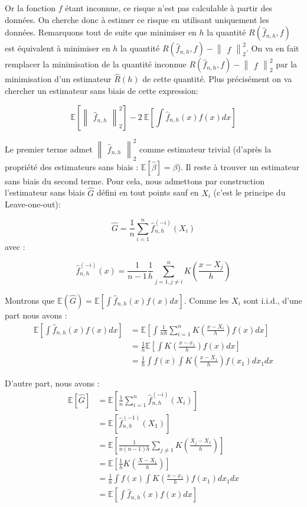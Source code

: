 \documentclass[
]{book}
\theoremstyle{definition}
\theoremstyle{definition}
\theoremstyle{definition}
\theoremstyle{definition}
\theoremstyle{remark}
\begin{document}
Or la fonction \(f\) étant inconnue, ce risque n'est pas calculable à partir des données. On cherche donc à estimer ce risque en utilisant uniquement les données. Remarquons tout de suite que minimiser en \(h\) la quantité \(R(\hat {f}_{n,h}, f)\) est équivalent à minimiser en \(h\) la quantité \(R(\hat {f}_{n,h}, f)-\begin{Vmatrix}f\end{Vmatrix}_2^2\). On va en fait remplacer la minimisation de la quantité inconnue \(R(\hat {f}_{n,h}, f)-\begin{Vmatrix}f\end{Vmatrix}_2^2\) par la minimisation d'un estimateur \(\hat {R}(h)\) de cette quantité. Plus précisément on va chercher un estimateur sans biais de cette expression:

\[
\mathbb{E}[\begin{Vmatrix}\hat {f}_{n,h}\end{Vmatrix}_2^2] -2~\mathbb{E}[\int \hat {f}_{n,h}(x)f(x)dx]
\]

Le premier terme admet \(\begin{Vmatrix}\hat {f}_{n,h}\end{Vmatrix}_2^2\) comme estimateur trivial (d'après la propriété des estimateurs sans biais : \(\mathbb{E}[\hat {\beta}]=\beta\)).\newline
Il reste à trouver un estimateur sans biais du second terme. Pour cela, nous admettons par construction l'estimateur sans biais \(\hat {G}\) défini en tout points sauf en \(X_i\) (c'est le principe du Leave-one-out):

\[
\hat{G} = \frac{1}{n}\sum_{i=1}^n\hat {f}_{n,h}^{(-i)}(X_i)
\]
avec :

\[
  \hat {f}_{n,h}^{(-i)}(x)= \frac{1}{n-1}\frac{1}{h}\sum_{j=1,j\ne i}^nK(\frac{x-X_j}{h})
\]

Montrons que \(\mathbb{E}(\hat{G})=\mathbb{E}[\int \hat{f}_{n,h}(x)f(x)dx]\).\newline
Comme les \(X_i\) sont i.i.d., d'une part nous avons :
\[
\begin{aligned}
\mathbb{E}[\int \hat {f}_{n,h}(x)f(x)dx]&= \mathbb{E}[\int \frac {1}{nh}\sum_{i=1}^nK(\frac {x-X_i}{h})f(x)dx]\\
&=\frac{1}{h}\mathbb{E}[\int K(\frac {x-x_1}{h})f(x)dx] \\
&=\frac{1}{h}\int f(x)\int K(\frac {x-X_1}{h})f(x_1)dx_1dx
\end{aligned}
\]

D'autre part, nous avons :
\[ 
\begin{aligned}
\mathbb{E}[\hat{G}]&=\mathbb{E}[\frac{1}{n}\sum_{i=1}^n\hat{f}_{n,h}^{(-i)}(X_i)]\\
&=\mathbb{E}[\hat{f}_{n,h}^{(-1)}(X_1)]\\
&=\mathbb{E}[\frac{1}{n(n-1)h}\sum_{j\ne 1}K(\frac{X_j-X_1}{h})]\\
&=\mathbb{E}[\frac{1}{h}K(\frac{X-X_1}{h})]\\
&=\frac{1}{h}\int f(x)\int K(\frac{x-x_1}{h})f(x_1)dx_1dx\\
&=\mathbb{E}[\int \hat{f}_{n,h}(x)f(x)dx] 
\end{aligned}
\]
\end{document}

